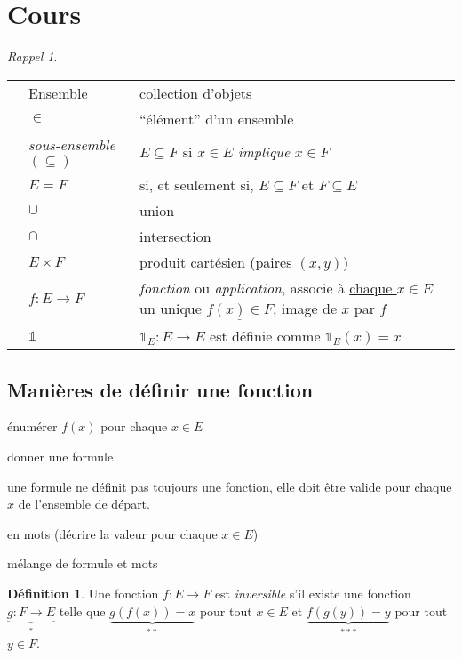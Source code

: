 \documentclass{report}
\newcounter{cours}
\newcommand*{\cours}{\section*{Cours \thecours}\stepcounter{cours}}
\newcommand*{\identite}{\mathds{1}}
\theoremstyle{definition}
\newtheorem*{defin}{D\'efinition}
\theoremstyle{remark}
\newtheorem*{rappel}{Rappel}
\begin{document}
	\cours
	\begin{rappel}
		~

		\begin{tabularx}{.9\textwidth}{cl>{\raggedright\arraybackslash}X}
			\textbullet&Ensemble&collection d'objets\\
			\textbullet&$\in$&``\'el\'ement'' d'un ensemble\\
			\textbullet&\emph{sous-ensemble} $(\subseteq)$&$E \subseteq F$ si $x \in E$ \emph{implique} $x \in F$\\
			\textbullet&$E=F$&si, et seulement si, $E \subseteq F$ et $F \subseteq E$\\
			\textbullet&$\cup$&union\\
			&$\cap$&intersection\\
			\textbullet&$E \times F$&produit cart\'esien (paires $(x,y)$)\\
			\textbullet&$f:E \to F$&\emph{fonction} ou \emph{application}, associe \`a \underline{chaque $x \in E$} un unique $\underline{f(x) \in F}$, image de $x$ par $f$\\
			\textbullet&$\identite$&$\identite_E:E \to E$ est d\'efinie comme $\identite_E(x)=x$
		\end{tabularx}
	\end{rappel}


	\subsection{Mani\`eres de d\'efinir une fonction}
	\begin{ulist}[noitemsep]
		\item \'enum\'erer $f(x)$ pour chaque $x \in E$
		\item donner une formule

		une formule ne d\'efinit pas toujours une fonction, elle doit \^etre valide pour chaque $x$ de l'ensemble de d\'epart.
		\item en mots (d\'ecrire la valeur pour chaque $x \in E$)
		\item m\'elange de formule et mots
	\end{ulist}

	\begin{defin}
		Une fonction $f:E \to F$ est \emph{inversible} s'il existe une fonction $\underbrace{g:F \to E}_{*}$ telle que $\underbrace{g(f(x))=x}_{**}$ pour tout $x \in E$ et $\underbrace{f(g(y))=y}_{***}$ pour tout $y \in F$.
	\end{defin}
\end{document}
